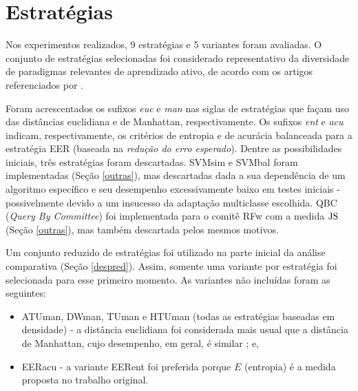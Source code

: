         
\section{Estratégias}\label{confstrats}

Nos experimentos realizados, 9 estratégias e 5 variantes foram avaliadas.
O conjunto de estratégias selecionadas foi considerado representativo da diversidade de paradigmas relevantes de aprendizado ativo, de acordo com os artigos referenciados por .

Foram acrescentados os sufixos \textit{euc} e \textit{man} nas siglas de estratégias que façam uso das distâncias euclidiana e de Manhattan, respectivamente.
Os sufixos \textit{ent} e \textit{acu} indicam, respectivamente, os critérios de entropia e de acurácia balanceada para a estratégia EER (baseada na \textit{redução do erro esperado}).
Dentre as possibilidades iniciais, três estratégias foram descartadas.
SVMsim e SVMbal foram implementadas (Seção \ref{outras}), mas descartadas dada a sua dependência de um algoritmo específico e seu desempenho excessivamente baixo em testes iniciais - possivelmente devido a um insucesso da adaptação multiclasse escolhida.
QBC (\textit{Query By Committee}) foi implementada para o comitê RFw com a medida $\operatorname*{JS}$ (Seção \ref{outras}), mas também descartada pelos mesmos motivos.

Um conjunto reduzido de estratégias foi utilizado na parte inicial da análise comparativa (Seção \ref{despred}).
Assim, somente uma variante por estratégia foi selecionada para esse primeiro momento.
As variantes não incluídas foram as seguintes:
\begin{itemize}
   \item ATUman, DWman, TUman e HTUman (todas as estratégias baseadas em densidade) - a distância euclidiana foi considerada mais usual que a distância de Manhattan, cujo desempenho, em geral, é similar \cite{bracis15}; e,
   \item EERacu - a variante EERent foi preferida porque $E$ (entropia) é a medida proposta no trabalho original.
\end{itemize}

